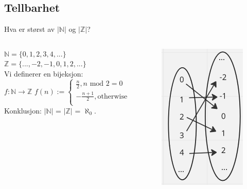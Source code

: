 \subsection{Tellbarhet}
\begin{frame}{Hva er størst av $|\mathbb{N}|$ og $|\mathbb{Z}|$?}
    \begin{columns}
    \begin{column}{0.35\textwidth}
        $\mathbb{N} = \{0, 1, 2, 3, 4, ...\}$\\
        $\mathbb{Z} = \{..., -2, -1, 0, 1, 2, ...\}$\\[5mm]
        \pause
        Vi definerer en bijeksjon:\\ 
        $f : \mathbb{N} \rightarrow \mathbb{Z}$
        $f(n) :=
        \begin{cases}
            \frac{n}{2}, n \text{ mod } 2 = 0\\
            -\frac{n+1}{2}, \text{otherwise}\\
        \end{cases}$\\[5mm]
        Konklusjon: $|\mathbb{N}|$ = $|\mathbb{Z}|$ = $\aleph_0$. 
    \end{column}
    \begin{column}{0.6\textwidth}
        \begin{figure}
            \includegraphics[scale=0.75]{images/n eq eq z.png}
        \end{figure}
    \end{column}
    \end{columns}    
\end{frame}

